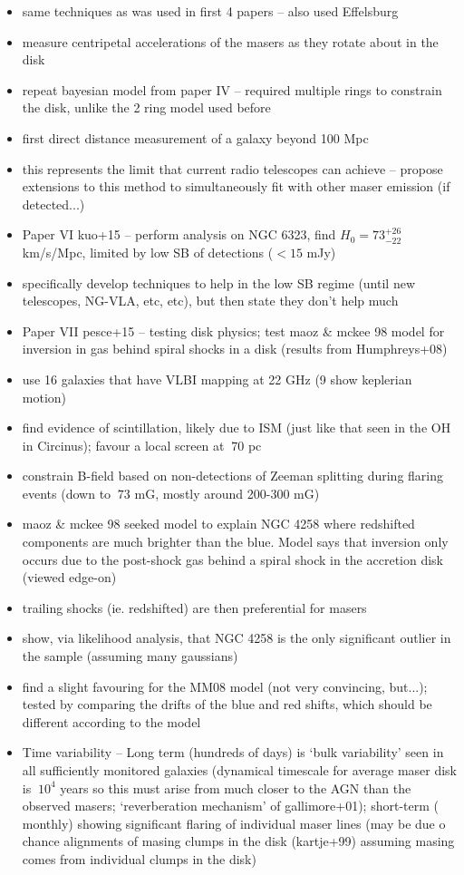 \begin{itemize}
\item same techniques as was used in first 4 papers -- also used Effelsburg
\item measure centripetal accelerations of the masers as they rotate about in the disk
\item repeat bayesian model from paper IV -- required multiple rings to constrain the disk, unlike the 2 ring model used before
\item first direct distance measurement of a galaxy beyond 100 Mpc
\item this represents the limit that current radio telescopes can achieve -- propose extensions to this method to simultaneously fit with other maser emission (if detected...)
\item Paper VI kuo+15 -- perform analysis on NGC 6323, find $H_0=73^{+26}_{-22}$ km/s/Mpc, limited by low SB of detections ($\lt 15$ mJy)
\item specifically develop techniques to help in the low SB regime (until new telescopes, NG-VLA, etc, etc), but then state they don't help much
\item Paper VII pesce+15 -- testing disk physics; test maoz & mckee 98 model for inversion in gas behind spiral shocks in a disk (results from Humphreys+08)
\item use 16 galaxies that have VLBI mapping at 22 GHz (9 show keplerian motion) 
\item find evidence of scintillation, likely due to ISM (just like that seen in the OH in Circinus); favour a local screen at $~70$ pc
\item constrain B-field based on non-detections of Zeeman splitting during flaring events (down to $~73$ mG, mostly around 200-300 mG)
\item maoz & mckee 98 seeked model to explain NGC 4258 where redshifted components are much brighter than the blue. Model says that inversion only occurs due to the post-shock gas behind a spiral shock in the accretion disk (viewed edge-on)
\item trailing shocks (ie. redshifted) are then preferential for masers
\item show, via likelihood analysis, that NGC 4258 is the only significant outlier in the sample (assuming many gaussians)
\item find a slight favouring for the MM08 model (not very convincing, but...); tested by comparing the drifts of the blue and red shifts, which should be different according to the model
\item Time variability -- Long term (hundreds of days) is `bulk variability' seen in all sufficiently monitored galaxies (dynamical timescale for average maser disk is $~10^4$ years so this must arise from much closer to the AGN than the observed masers; `reverberation mechanism' of gallimore+01); short-term ($~$monthly) showing significant flaring of individual maser lines (may be due o chance alignments of masing clumps in the disk (kartje+99) assuming masing comes from individual clumps in the disk)

\end{itemize}
